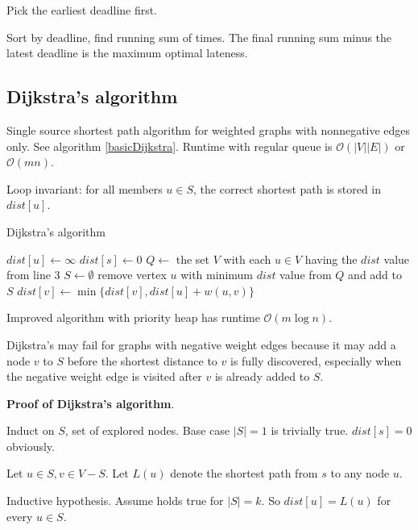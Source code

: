 \documentclass{article}
\newcommand{\Oh}{\mathcal{O}}
\begin{document}
Pick the earliest deadline first.

Sort by deadline, find running sum of times. The final running sum minus the latest deadline is the maximum optimal lateness.

\subsection{Dijkstra's algorithm}
Single source shortest path algorithm for weighted graphs with nonnegative edges only. See algorithm \ref{basicDijkstra}. Runtime with regular queue is $\Oh(|V||E|)$ or $\Oh(mn)$.

Loop invariant: for all members $u \in S$, the correct shortest path is stored in $dist[u]$.

\begin{algorithm}
\caption{Dijkstra's algorithm}\label{basicDijkstra}
\begin{algorithmic}[1]
        \State $dist[u] \gets \infty$
    \EndFor
    \State $dist[s] \gets 0$
    \State $Q \gets$ the set $V$ with each $u \in V$ having the $dist$ value from line 3
    \State $S \gets \emptyset$ 
        \State remove vertex $u$ with minimum $dist$ value from $Q$ and add to $S$
                \State $dist[v] \gets \min\{dist[v], dist[u] + w(u, v)\}$
            \EndIf
        \EndFor
    \EndWhile
\EndProcedure
\end{algorithmic}
\end{algorithm}

Improved algorithm with priority heap has runtime $\Oh(m \log n)$.

Dijkstra's may fail for graphs with negative weight edges because it may add a node $v$ to $S$ before the shortest distance to $v$ is fully discovered, especially when the negative weight edge is visited after $v$ is already added to $S$.

\textbf{Proof of Dijkstra's algorithm}.

Induct on $S$, set of explored nodes. Base case $|S| = 1$ is trivially true. $dist[s] = 0$ obviously.

Let $u \in S, v \in V - S$. Let $L(u)$ denote the shortest path from $s$ to any node $u$.

Inductive hypothesis. Assume holds true for $|S| = k$. So $dist[u] = L(u)$ for every $u \in S$.
\end{document}
